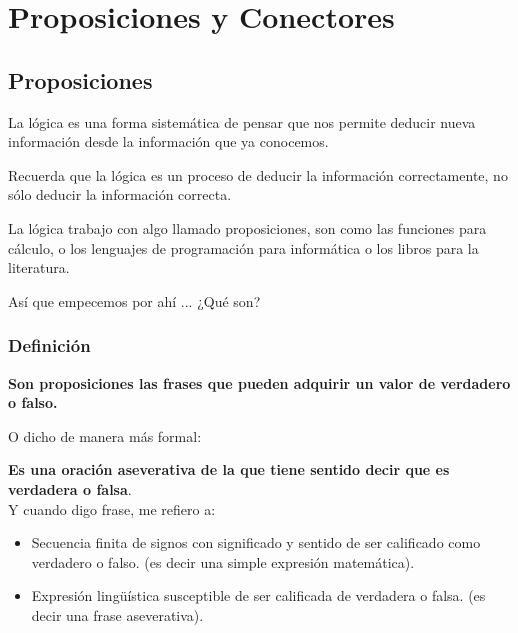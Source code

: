 \documentclass[12pt, fleqn]{report}                             %
\begin{document}
    \chapter{Proposiciones y Conectores}
        \clearpage

        \section{Proposiciones}

            La lógica es una forma sistemática de pensar que nos permite deducir nueva información desde la
            información que ya conocemos.

            Recuerda que la lógica es un proceso de deducir la información correctamente,
            no sólo deducir la información correcta.

            La lógica trabajo con algo llamado proposiciones, son como las funciones para
            cálculo, o los lenguajes de programación para informática o los libros para la literatura.

            Así que empecemos por ahí ... ¿Qué son?

            \subsection*{Definición}
                
                \textbf{Son proposiciones las frases que pueden adquirir un valor de verdadero o falso.}
                
                O dicho de manera más formal:

                \textbf{Es una oración aseverativa de la que tiene sentido decir que es verdadera o falsa}.\\

                Y cuando digo frase, me refiero a:
                \begin{itemize}
                    \item Secuencia finita de signos con significado y sentido de ser calificado como verdadero o falso.
                            (es decir una simple expresión matemática).

                    \item Expresión lingüística susceptible de ser calificada de verdadera o falsa.
                            (es decir una frase aseverativa).
                \end{itemize}
\end{document}
